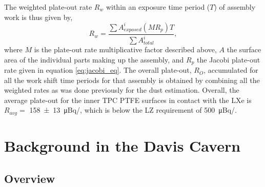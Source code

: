 The weighted plate-out rate $R_w$ within an exposure time period ($T$) of assembly work is thus given by,
%
\begin{equation}
    R_w = \frac{\sum A_{exposed}^i (M R_p)T}{\sum A_{total}^i},
    \label{eq:weighted_plate-out}
\end{equation}
%
where $M$ is the plate-out rate multiplicative factor described above, $A$ the surface area of the individual parts making up the assembly, and ${R_p}$ the Jacobi plate-out rate given in equation \ref{eq:jacobi_eq}. The overall plate-out, $R_O$, accumulated for all the work shift time periods for that assembly is obtained by combining all the weighted rates as was done previously for the dust estimation. Overall, the average plate-out for the inner TPC PTFE surfaces in contact with the LXe is $R_{avg}=$ \SI{158\pm 13} {\micro \becquerel}/\squaremeter, which is below the LZ requirement of \SI{500} {\micro\becquerel}/\squaremeter.


\section{\gray{} Background in the Davis Cavern}
\label{sec:external_backgrounds}

\subsection{Overview}

